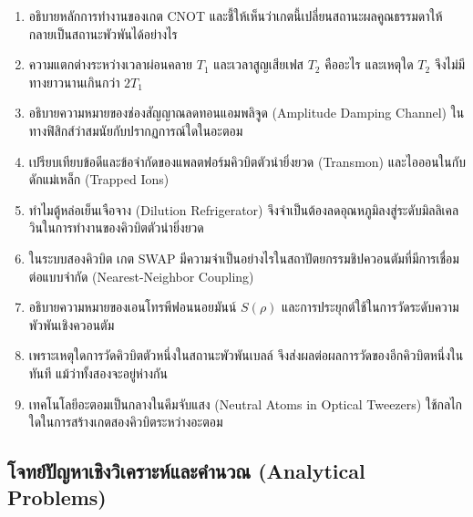 \begin{enumerate}[label=\textbf{\arabic*.}]
    \item อธิบายหลักการทำงานของเกต CNOT และชี้ให้เห็นว่าเกตนี้เปลี่ยนสถานะผลคูณธรรมดาให้กลายเป็นสถานะพัวพันได้อย่างไร
    \item ความแตกต่างระหว่างเวลาผ่อนคลาย $T_1$ และเวลาสูญเสียเฟส $T_2$ คืออะไร และเหตุใด $T_2$ จึงไม่มีทางยาวนานเกินกว่า $2T_1$
    \item อธิบายความหมายของช่องสัญญาณลดทอนแอมพลิจูด (Amplitude Damping Channel) ในทางฟิสิกส์ว่าสมนัยกับปรากฏการณ์ใดในอะตอม
    \item เปรียบเทียบข้อดีและข้อจำกัดของแพลตฟอร์มคิวบิตตัวนำยิ่งยวด (Transmon) และไอออนในกับดักแม่เหล็ก (Trapped Ions)
    \item ทำไมตู้หล่อเย็นเจือจาง (Dilution Refrigerator) จึงจำเป็นต้องลดอุณหภูมิลงสู่ระดับมิลลิเคลวินในการทำงานของคิวบิตตัวนำยิ่งยวด
    \item ในระบบสองคิวบิต เกต SWAP มีความจำเป็นอย่างไรในสถาปัตยกรรมชิปควอนตัมที่มีการเชื่อมต่อแบบจำกัด (Nearest-Neighbor Coupling)
    \item อธิบายความหมายของเอนโทรพีฟอนนอยมันน์ $S(\rho)$ และการประยุกต์ใช้ในการวัดระดับความพัวพันเชิงควอนตัม
    \item เพราะเหตุใดการวัดคิวบิตตัวหนึ่งในสถานะพัวพันเบลล์ จึงส่งผลต่อผลการวัดของอีกคิวบิตหนึ่งในทันที แม้ว่าทั้งสองจะอยู่ห่างกัน
    \item เทคโนโลยีอะตอมเป็นกลางในคีมจับแสง (Neutral Atoms in Optical Tweezers) ใช้กลไกใดในการสร้างเกตสองคิวบิตระหว่างอะตอม
\end{enumerate}

\subsection*{โจทย์ปัญหาเชิงวิเคราะห์และคำนวณ (Analytical Problems)}

